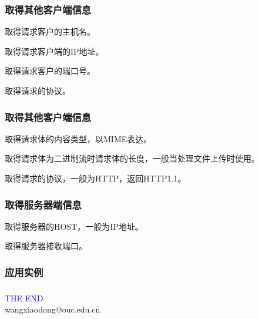 \begin{frame}[fragile] %
\frametitle{取得其他客户端信息} 


取得请求客户的主机名。


取得请求客户端的IP地址。


取得请求客户的端口号。


取得请求的协议。
\end{frame}

\begin{frame}[fragile] %
\frametitle{取得其他客户端信息} 


取得请求体的内容类型，以MIME表达。


取得请求体为二进制流时请求体的长度，一般当处理文件上传时使用。


取得请求的协议，一般为HTTP，返回HTTP1.1。
\end{frame}

\begin{frame}[fragile] %
\frametitle{取得服务器端信息} 


取得服务器的HOST，一般为IP地址。


取得服务器接收端口。
\end{frame}

\begin{frame}[fragile] %
\frametitle{应用实例} 

\end{frame}
\begin{frame}[fragile] %
\frametitle{} 

\end{frame}
\begin{frame}
\centering
{\Huge \textcolor{blue}{THE END}} \\
\vspace{5mm}
{\Large wangxiaodong@ouc.edu.cn} \\
\end{frame}

